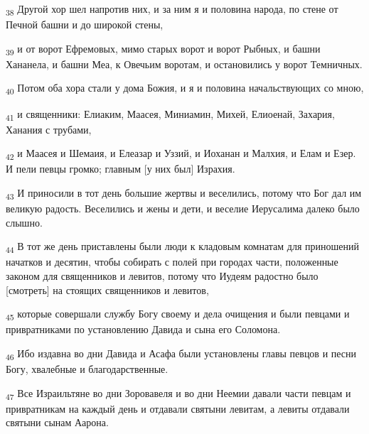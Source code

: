 \begin{tcolorbox}
\textsubscript{38} Другой хор шел напротив них, и за ним я и половина народа, по стене от Печной башни и до широкой стены,
\end{tcolorbox}
\begin{tcolorbox}
\textsubscript{39} и от ворот Ефремовых, мимо старых ворот и ворот Рыбных, и башни Хананела, и башни Меа, к Овечьим воротам, и остановились у ворот Темничных.
\end{tcolorbox}
\begin{tcolorbox}
\textsubscript{40} Потом оба хора стали у дома Божия, и я и половина начальствующих со мною,
\end{tcolorbox}
\begin{tcolorbox}
\textsubscript{41} и священники: Елиаким, Маасея, Миниамин, Михей, Елиоенай, Захария, Ханания с трубами,
\end{tcolorbox}
\begin{tcolorbox}
\textsubscript{42} и Маасея и Шемаия, и Елеазар и Уззий, и Иоханан и Малхия, и Елам и Езер. И пели певцы громко; главным [у них был] Израхия.
\end{tcolorbox}
\begin{tcolorbox}
\textsubscript{43} И приносили в тот день большие жертвы и веселились, потому что Бог дал им великую радость. Веселились и жены и дети, и веселие Иерусалима далеко было слышно.
\end{tcolorbox}
\begin{tcolorbox}
\textsubscript{44} В тот же день приставлены были люди к кладовым комнатам для приношений начатков и десятин, чтобы собирать с полей при городах части, положенные законом для священников и левитов, потому что Иудеям радостно было [смотреть] на стоящих священников и левитов,
\end{tcolorbox}
\begin{tcolorbox}
\textsubscript{45} которые совершали службу Богу своему и дела очищения и были певцами и привратниками по установлению Давида и сына его Соломона.
\end{tcolorbox}
\begin{tcolorbox}
\textsubscript{46} Ибо издавна во дни Давида и Асафа были установлены главы певцов и песни Богу, хвалебные и благодарственные.
\end{tcolorbox}
\begin{tcolorbox}
\textsubscript{47} Все Израильтяне во дни Зоровавеля и во дни Неемии давали части певцам и привратникам на каждый день и отдавали святыни левитам, а левиты отдавали святыни сынам Аарона.
\end{tcolorbox}
